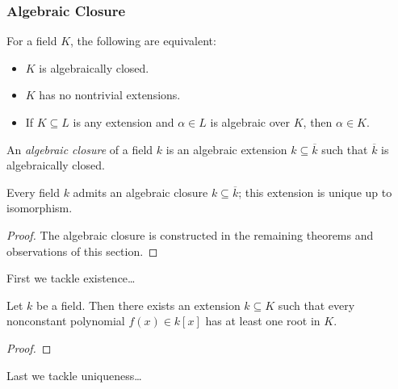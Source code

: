 \subsubsection{Algebraic Closure}\label{algebraicclosure}
\begin{lemma}
For a field $K$, the following are equivalent:
\begin{itemize}
  \item $K$ is algebraically closed.
  \item $K$ has no nontrivial extensions.
  \item If $K \subseteq L$ is any extension and $\alpha \in L$ is algebraic over $K$, then $\alpha \in K$.
\end{itemize}
\end{lemma}

\noindent An \emph{algebraic closure} of a field $k$ is an algebraic extension $k \subseteq \overline{k}$ such that
$\overline{k}$ is algebraically closed.

\begin{theorem}
Every field $k$ admits an algebraic closure $k \subseteq \overline{k}$;
this extension is unique up to isomorphism.
\end{theorem}

\begin{proof}
The algebraic closure is constructed in the remaining theorems and observations
of this section.
\end{proof}


\noindent First we tackle existence\dots

\begin{lemma}
Let $k$ be a field. Then there exists an extension $k \subseteq K$ such that
every nonconstant polynomial $f(x) \in k[x]$ has at least one root in $K$.
\end{lemma}

\begin{proof}

\end{proof}

\noindent Last we tackle uniqueness\dots